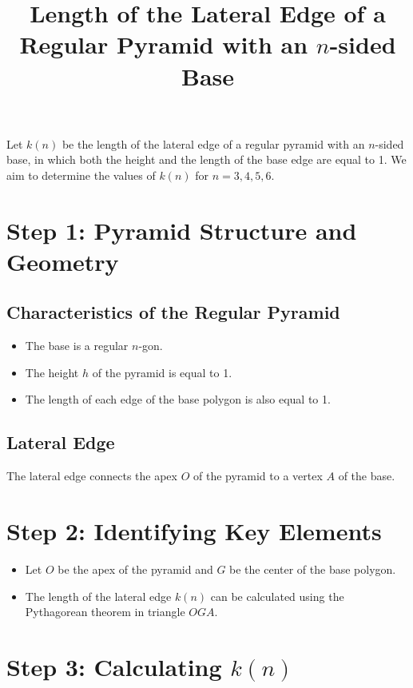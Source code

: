 \documentclass{article}
\title{Length of the Lateral Edge of a Regular Pyramid with an \( n \)-sided Base}
\author{}
\date{}
\begin{document}
\maketitle

Let \( k(n) \) be the length of the lateral edge of a regular pyramid with an \( n \)-sided base, in which both the height and the length of the base edge are equal to 1. We aim to determine the values of \( k(n) \) for \( n = 3, 4, 5, 6 \).

\section*{Step 1: Pyramid Structure and Geometry}

\subsection*{Characteristics of the Regular Pyramid}
\begin{itemize}
    \item The base is a regular \( n \)-gon.
    \item The height \( h \) of the pyramid is equal to 1.
    \item The length of each edge of the base polygon is also equal to 1.
\end{itemize}

\subsection*{Lateral Edge}
The lateral edge connects the apex \( O \) of the pyramid to a vertex \( A \) of the base.

\section*{Step 2: Identifying Key Elements}

\begin{itemize}
    \item Let \( O \) be the apex of the pyramid and \( G \) be the center of the base polygon.
    \item The length of the lateral edge \( k(n) \) can be calculated using the Pythagorean theorem in triangle \( OGA \).
\end{itemize}

\section*{Step 3: Calculating \( k(n) \)}
\end{document}
